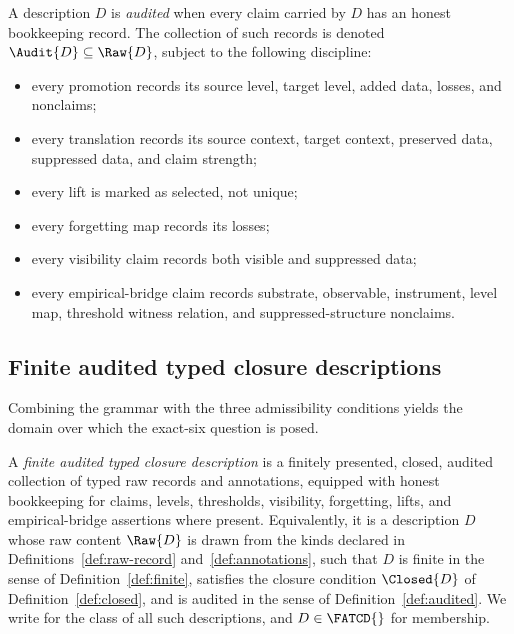 \begin{definition}\label{def:audited}
A description \(D\) is \emph{audited} when every claim carried by \(D\) has an
honest bookkeeping record. The collection of such records is denoted
\(\Audit{D} \subseteq \Raw{D}\), subject to the following discipline:
\begin{itemize}[topsep=2pt,itemsep=1pt]
  \item every promotion records its source level, target level, added data,
    losses, and nonclaims;
  \item every translation records its source context, target context,
    preserved data, suppressed data, and claim strength;
  \item every lift is marked as selected, not unique;
  \item every forgetting map records its losses;
  \item every visibility claim records both visible and suppressed data;
  \item every empirical-bridge claim records substrate, observable,
    instrument, level map, threshold witness relation, and
    suppressed-structure nonclaims.
\end{itemize}
\end{definition}

\subsection{Finite audited typed closure descriptions}\label{subsec:fatcd}

Combining the grammar with the three admissibility conditions yields
the domain over which the exact-six question is posed.

\begin{definition}\label{def:fatcd}
A \emph{finite audited typed closure description} is a finitely presented,
closed, audited collection of typed raw records and annotations, equipped with
honest bookkeeping for claims, levels, thresholds, visibility, forgetting,
lifts, and empirical-bridge assertions where present. Equivalently, it is a
description \(D\) whose raw content \(\Raw{D}\) is drawn from the kinds
declared in Definitions~\ref{def:raw-record} and~\ref{def:annotations}, such
that \(D\) is finite in the sense of Definition~\ref{def:finite}, satisfies
the closure condition \(\Closed{D}\) of Definition~\ref{def:closed}, and is
audited in the sense of Definition~\ref{def:audited}. We write \FATCD{} for
the class of all such descriptions, and \(D \in \FATCD{}\) for membership.
\end{definition}

